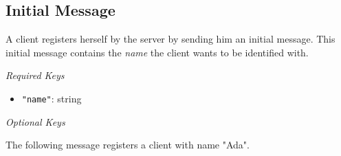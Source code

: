 \documentclass{scrartcl}
\begin{document}
\subsection{Initial Message}
A client registers herself by the server by sending him an initial message.
This initial message contains the \emph{name} the client wants to be identified
with.
\begin{mdframed}[frametitle = {Specification}]
  \emph{Required Keys}
  \begin{itemize}
    \item \texttt{"name"}: string
  \end{itemize}
  \emph{Optional Keys}
\end{mdframed}
\begin{mdframed}[frametitle = {Example}]
  The following message registers a client with name "Ada".
  \inputminted{json}{examples/initial-message.json}
\end{mdframed}
\end{document}
